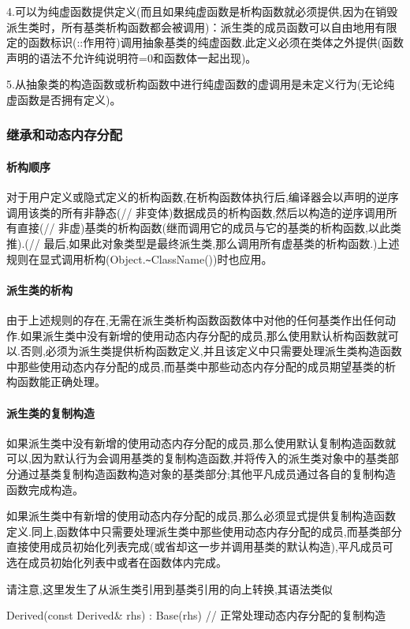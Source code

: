 \documentclass[UTF8]{ctexart}
\begin{document}
4.可以为纯虚函数提供定义(而且如果纯虚函数是析构函数就必须提供,因为在销毁派生类时，所有基类析构函数都会被调用)：派生类的成员函数可以自由地用有限定的函数标识(::作用符)调用抽象基类的纯虚函数.此定义必须在类体之外提供(函数声明的语法不允许纯说明符=0和函数体一起出现)。

5.从抽象类的构造函数或析构函数中进行纯虚函数的虚调用是未定义行为(无论纯虚函数是否拥有定义)。

\subsubsection{继承和动态内存分配}
\paragraph{析构顺序}
对于用户定义或隐式定义的析构函数,在析构函数体执行后,编译器会以声明的逆序调用该类的所有非静态(// 非变体)数据成员的析构函数,然后以构造的逆序调用所有直接(// 非虚)基类的析构函数(继而调用它的成员与它的基类的析构函数,以此类推).(// 最后,如果此对象类型是最终派生类,那么调用所有虚基类的析构函数.)上述规则在显式调用析构(Object.\verb|~|ClassName())时也应用。
\paragraph{派生类的析构}
由于上述规则的存在,无需在派生类析构函数函数体中对他的任何基类作出任何动作.如果派生类中没有新增的使用动态内存分配的成员,那么使用默认析构函数就可以.否则,必须为派生类提供析构函数定义,并且该定义中只需要处理派生类构造函数中那些使用动态内存分配的成员,而基类中那些动态内存分配的成员期望基类的析构函数能正确处理。
\paragraph{派生类的复制构造}
如果派生类中没有新增的使用动态内存分配的成员,那么使用默认复制构造函数就可以,因为默认行为会调用基类的复制构造函数,并将传入的派生类对象中的基类部分通过基类复制构造函数构造对象的基类部分;其他平凡成员通过各自的复制构造函数完成构造。

如果派生类中有新增的使用动态内存分配的成员,那么必须显式提供复制构造函数定义.同上,函数体中只需要处理派生类中那些使用动态内存分配的成员,而基类部分直接使用成员初始化列表完成(或省却这一步并调用基类的默认构造),平凡成员可选在成员初始化列表中或者在函数体内完成。

请注意,这里发生了从派生类引用到基类引用的向上转换,其语法类似

Derived(const Derived\& rhs) : Base(rhs){    // 正常处理动态内存分配的复制构造}
\end{document}

